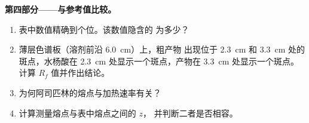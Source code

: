 \begin{problem}
\noindent\textbf{第四部分——与参考值比较。}
\begin{enumerate}[resume]
  \item 表中数值精确到个位。该数值隐含的
        为多少？
  \item 薄层色谱板（溶剂前沿 \qty{6.0}{cm}）上，粗产物
        出现位于 \qty{2.3}{cm} 和 \qty{3.3}{cm} 处的斑点，水杨酸在
        \qty{2.3}{cm} 处显示一个斑点，产物在
        \qty{3.3}{cm} 处显示一个斑点。计算 $R_f$ 值并作出结论。
  \item 为何阿司匹林的熔点与加热速率有关？
  \item 计算测量熔点与表中熔点之间的 $z$，
        并判断二者是否相容。
\end{enumerate}
\end{problem}
